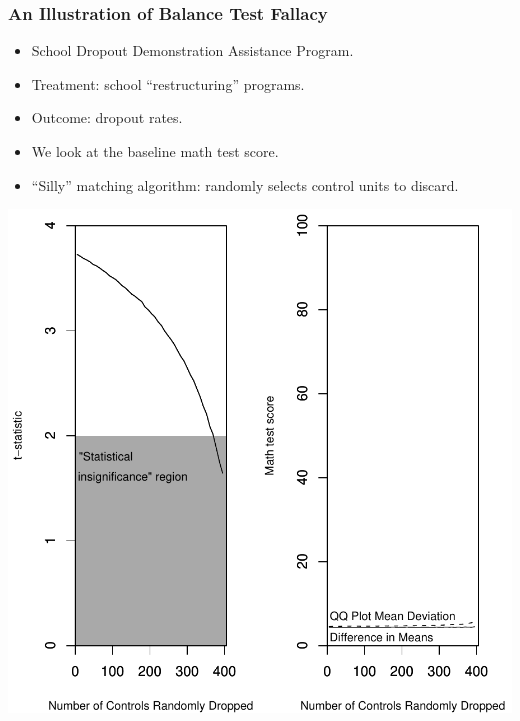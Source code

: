 \documentclass[trans]{beamer}
\begin{document}
\begin{frame}
  \frametitle{An Illustration of Balance Test Fallacy}

\begin{minipage}[l]{1.75in}
  \begin{itemize}
  \item School Dropout Demonstration Assistance Program.
  \item Treatment: school ``restructuring'' programs.
  \item Outcome: dropout rates.
  \item We look at the baseline math test score.
  \item ``Silly'' matching algorithm: randomly selects control units
    to discard.
  \end{itemize}
\end{minipage}
\begin{minipage}[l]{1in}
  \includegraphics[scale=0.5]{figs/TStatPlotR0MATH}
\end{minipage}

\end{frame}
\end{document}
